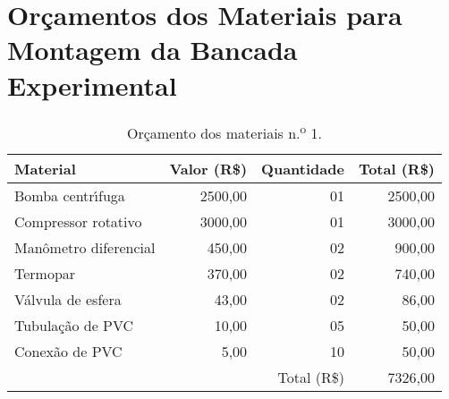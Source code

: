 
\chapter{Or\c{c}amentos dos Materiais para Montagem da Bancada Experimental}\label{cap:apendiceb}

\begin{table}[Htb]%
\caption{Or\c{c}amento dos materiais n.\textsuperscript{o} 1.}%
\label{tab:tab3}%
\begin{tabularx}{\textwidth}{@{\extracolsep{\fill}}lrrr}%
\toprule
Material              & \multicolumn{1}{c}{Valor (R\$)} & \multicolumn{1}{c}{Quantidade}  & \multicolumn{1}{c}{Total (R\$)} \\ \midrule
Bomba centr\'{\i}fuga      & 2500,00                         & 01                              & 2500,00                         \\
Compressor rotativo   & 3000,00                         & 01                              & 3000,00                         \\
Man\^ometro diferencial & 450,00                          & 02                              & 900,00                          \\
Termopar              & 370,00                          & 02                              & 740,00                          \\
V\'alvula de esfera     & 43,00                           & 02                              & 86,00                           \\
Tubula\c{c}\~ao de PVC      & 10,00                           & 05                              & 50,00                           \\
Conex\~ao de PVC        & 5,00                            & 10                              & 50,00                           \\ \midrule
                      &                                 & \multicolumn{1}{r}{Total (R\$)} & 7326,00                         \\ \bottomrule
\end{tabularx}
\end{table}

